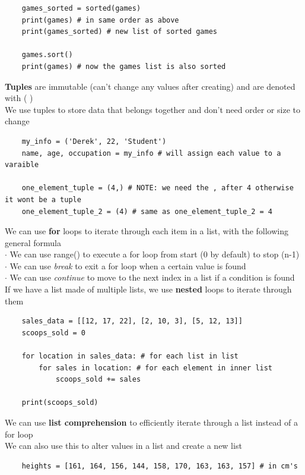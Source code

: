 \documentclass[11pt, a4paper]{article}
\begin{document}
\begin{spacing}{1.1}
\begin{lstlisting}
	games_sorted = sorted(games)
	print(games) # in same order as above
	print(games_sorted) # new list of sorted games
	
	games.sort()
	print(games) # now the games list is also sorted \end{lstlisting}\vspace*{1mm}
	\textbf{Tuples} are immutable (can't change any values after creating) and are denoted with ( ) \\
	We use tuples to store data that belongs together and don't need order or size to change
	\begin{lstlisting}
	my_info = ('Derek', 22, 'Student')
	name, age, occupation = my_info # will assign each value to a varaible
	
	one_element_tuple = (4,) # NOTE: we need the , after 4 otherwise it wont be a tuple
	one_element_tuple_2 = (4) # same as one_element_tuple_2 = 4	 \end{lstlisting} \vspace*{4mm}
	We can use \textbf{for} loops to iterate through each item in a list, with the following general formula \\
	\hspace*{1.5mm} $\cdot$ We can use range() to execute a for loop from start (0 by default) to stop (n-1) \\
	\hspace*{1.5mm} $\cdot$ We can use \textit{break} to exit a for loop when a certain value is found \\
	\hspace*{1.5mm} $\cdot$ We can use \textit{continue} to move to the next index in a list if a condition is found \\
	If we have a list made of multiple lists, we use \textbf{nested} loops to iterate through them
	\begin{lstlisting}
	sales_data = [[12, 17, 22], [2, 10, 3], [5, 12, 13]]
	scoops_sold = 0
	
	for location in sales_data: # for each list in list
		for sales in location: # for each element in inner list
			scoops_sold += sales
	
	print(scoops_sold) \end{lstlisting} \newpage
	\noindent We can use \textbf{list comprehension} to efficiently iterate through a list instead of a for loop \\
	We can also use this to alter values in a list and create a new list
	\begin{lstlisting}
	heights = [161, 164, 156, 144, 158, 170, 163, 163, 157] # in cm's
	

\end{lstlisting}
\end{spacing}
\end{document}
